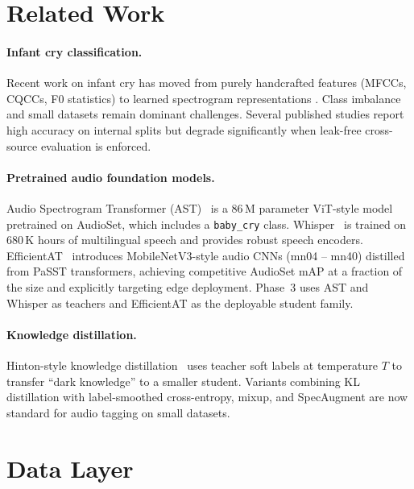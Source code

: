 \documentclass[11pt,a4paper]{article}
\begin{document}
\section{Related Work}
\label{sec:related}

\paragraph{Infant cry classification.}
Recent work on infant cry has moved from purely handcrafted features
(MFCCs, CQCCs, F0 statistics) to learned spectrogram representations
\cite{ji2021review}. Class imbalance and small datasets remain dominant
challenges. Several published studies report high accuracy on internal
splits but degrade significantly when leak-free cross-source evaluation
is enforced.

\paragraph{Pretrained audio foundation models.}
Audio Spectrogram Transformer (AST)~\cite{gong2021ast} is a 86\,M
parameter ViT-style model pretrained on AudioSet, which includes a
\texttt{baby\_cry} class. Whisper~\cite{radford2023whisper} is trained
on 680\,K hours of multilingual speech and provides robust speech
encoders. EfficientAT~\cite{schmid2023efficientat} introduces
MobileNetV3-style audio CNNs (mn04 -- mn40) distilled from PaSST
transformers, achieving competitive AudioSet mAP at a fraction of the
size and explicitly targeting edge deployment. Phase~3 uses AST and
Whisper as teachers and EfficientAT as the deployable student family.

\paragraph{Knowledge distillation.}
Hinton-style knowledge distillation~\cite{hinton2015distilling} uses
teacher soft labels at temperature $T$ to transfer ``dark knowledge'' to
a smaller student. Variants combining KL distillation with
label-smoothed cross-entropy, mixup, and SpecAugment are now standard
for audio tagging on small datasets.

\section{Data Layer}
\label{sec:data}
\end{document}
